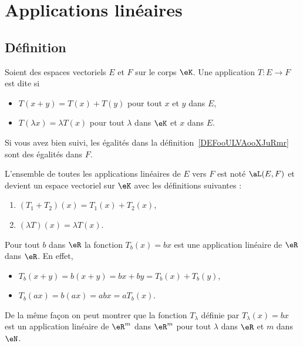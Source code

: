 \section{Applications linéaires}

\subsection{Définition}

\begin{definition}      \label{DEFooULVAooXJuRmr}
    Soient des espaces vectoriels \( E \) et \( F\) sur le corps \( \eK\). Une application \( T\colon E\to F\) est dite  si
    \begin{itemize}
        \item $T(x+y)=T(x)+T(y)$ pour tout $x$ et $y$ dans \( E\),
        \item $T(\lambda x)=\lambda T(x)$ pour tout $\lambda$ dans $\eK$ et \( x\) dans \( E\).
    \end{itemize}
\end{definition}
Si vous avez bien suivi, les égalités dans la définition~\ref{DEFooULVAooXJuRmr} sont des égalités dans \( F\).

\begin{lemmaDef} \label{DefDQRooVGbzSm}
    L'ensemble de toutes les applications linéaires de \( E\) vers \( F\) est noté \( \aL(E,F)\) et devient un espace vectoriel sur \( \eK\) avec les définitions suivantes :
    \begin{enumerate}
        \item
            \( (T_1+T_2)(x)=T_1(x)+T_2(x)\),
        \item
            \( (\lambda T)(x)=\lambda T(x)\).
    \end{enumerate}
\end{lemmaDef}

\begin{example}
Pour tout $b$ dans $\eR$ la fonction $T_b(x)= bx$ est une application linéaire de $\eR$ dans $\eR$. En effet,
\begin{itemize}
\item  $T_b(x+y)= b(x+y)= bx + by = T_b(x)+T_b(y)$,
\item $T_b(ax)=b(ax)= abx = a T_b(x)$.
\end{itemize}
De la même façon on peut montrer que la fonction $T_{\lambda}$ définie par $T_{\lambda}(x)=bx$ est un application linéaire de $\eR^m$ dans $\eR^m$ pour tout $\lambda$ dans $\eR$ et $m$ dans $\eN$.
\end{example}


